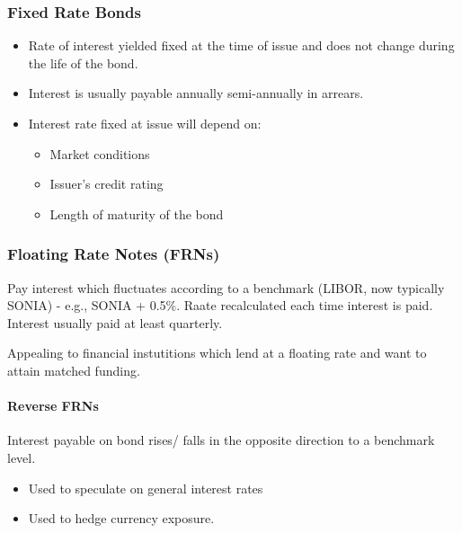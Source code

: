\documentclass[
]{article}
\providecommand{\tightlist}{%
  \setlength{\itemsep}{0pt}\setlength{\parskip}{0pt}}
\begin{document}
\hypertarget{fixed-rate-bonds}{%
\subsubsection{Fixed Rate Bonds}\label{fixed-rate-bonds}}

\begin{itemize}
\tightlist
\item
  Rate of interest yielded fixed at the time of issue and does not
  change during the life of the bond.
\item
  Interest is usually payable annually semi-annually in arrears.
\item
  Interest rate fixed at issue will depend on:

  \begin{itemize}
  \tightlist
  \item
    Market conditions
  \item
    Issuer's credit rating
  \item
    Length of maturity of the bond
  \end{itemize}
\end{itemize}

\hypertarget{floating-rate-notes-frns}{%
\subsubsection{Floating Rate Notes
(FRNs)}\label{floating-rate-notes-frns}}

Pay interest which fluctuates according to a benchmark (LIBOR, now
typically SONIA) - e.g., SONIA + 0.5\%. Raate recalculated each time
interest is paid. Interest usually paid at least quarterly.

Appealing to financial instutitions which lend at a floating rate and
want to attain matched funding.

\hypertarget{reverse-frns}{%
\paragraph{Reverse FRNs}\label{reverse-frns}}

Interest payable on bond rises/ falls in the opposite direction to a
benchmark level.

\begin{itemize}
\tightlist
\item
  Used to speculate on general interest rates
\item
  Used to hedge currency exposure.
\end{itemize}
\end{document}
